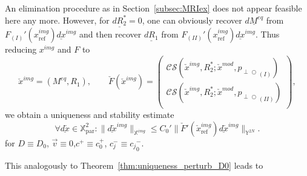 \documentclass{ws-m3as}
\newcommand{\uld}[1]{\underline{d#1}}
\newcommand{\allximgDzero}[1]{}
\newcommand\xred{\check{x}}
\newcommand\Fred{\check{F}}
\def\pp{p_{\perp\!\!\!\!\!\bigcirc}}
\newcommand\Xpar{\mathbb{X}_{\text{par}}}
\begin{document}
\allximgDzero{
With the same elimination procedure as in Section~\ref{subsec:MRIex}, this leads to a uniqueness and stability estimate 
\begin{equation}\label{stab_0_lin}
\forall  \uld{x}\in \Xpar^3:
\|\uld{x}^{img}\|_{\mathbb{X}^{img}}\leq C_0'
\|F'(x^{img}_{\text{ref}})\uld{x}^{img}\|_{\mathbb{Y}^{3N}}.
\end{equation}
for $D\equiv D_0$, $\vec{v}\equiv 0$,$c^+\equiv c^+_0$, $c_j^-\equiv {c_j}^-_0$.
}

An elimination procedure as in Section~\ref{subsec:MRIex} does not appear feasible here any more. However, for $\uld{R_2^*}=0$, one can obviously 
recover $\uld{M^{eq}}$ from $F_{(I)}'(x^{img}_{\text{ref}})\uld{x}^{img}$ and then 
recover $\uld{R_1}$ from $F_{(II)}'(x^{img}_{\text{ref}})\uld{x}^{img}$.
Thus reducing $x^{img}$ and $F$ to 
\begin{equation}\label{xred_Fred}
\xred^{img}=(M^{eq},R_1),
\qquad 
\Fred(\xred^{img})=\left(\begin{array}{c}
\mathcal{C}\mathcal{S}(\xred^{img},R_2^*;\check{x}^{mod},{\pp}_{(I)})\\
\mathcal{C}\mathcal{S}(\xred^{img},R_2^*;\check{x}^{mod},{\pp}_{(II)})\\
\end{array}\right),
\end{equation}
we obtain a uniqueness and stability estimate 
\begin{equation}\label{stab_0_lin}
\forall  \uld{\xred}\in \Xpar^2:
\|\uld{\xred}^{img}\|_{\mathbb{X}^{img}}\leq C_0'
\|\Fred'(\xred^{img}_{\text{ref}})\uld{\xred}^{img}\|_{\mathbb{Y}^{2N}}.
\end{equation}
for $D\equiv D_0$, $\vec{v}\equiv 0$,$c^+\equiv c^+_0$, $c_j^-\equiv {c_j}^-_0$.

This analogously to Theorem~\ref{thm:uniqueness_perturb_D0} leads to
\end{document}
